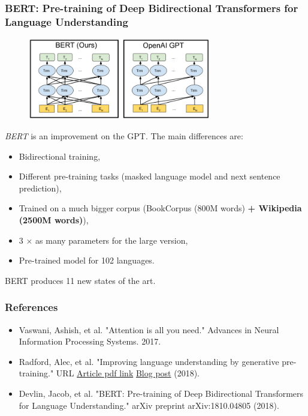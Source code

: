 \documentclass[9pt]{beamer}
\begin{document}
\begin{frame}
  \frametitle{BERT: Pre-training of Deep Bidirectional Transformers
    for Language Understanding}

  \begin{figure}
    \includegraphics[width = 8cm]{images/bert.png}
  \end{figure}

  \emph{BERT} is an improvement on the GPT. The main differences are:
  \begin{itemize}
  \item Bidirectional training,
  \item Different pre-training tasks (masked language model and next
    sentence prediction),
  \item Trained on a much bigger corpus (BookCorpus (800M words) \textbf{+
    Wikipedia (2500M words)}),
  \item 3 $\times$ as many parameters for the large version,
  \item Pre-trained model for 102 languages.
  \end{itemize}

  BERT produces 11 new states of the art.
\end{frame}

\begin{frame}
  \frametitle{References}

  \begin{itemize}
  \item Vaswani, Ashish, et al. "Attention is all you need." Advances in Neural Information Processing Systems. 2017.

  \item Radford, Alec, et al. "Improving language understanding by generative pre-training." URL
    \href{https://s3-us-west-2.amazonaws.com/openai-assets/research-covers/language-unsupervised/language_understanding_paper.pdf}{Article pdf link}
    \href{https://blog.openai.com/language-unsupervised/}{Blog post} (2018).

  \item Devlin, Jacob, et al. "BERT: Pre-training of Deep Bidirectional Transformers for Language Understanding." arXiv preprint arXiv:1810.04805 (2018).
  \end{itemize}
\end{frame}
\end{document}
